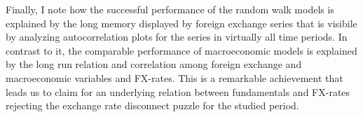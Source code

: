 Finally, I note how the successful performance of the random walk
models is explained by the long memory displayed by foreign exchange
series that is visibile by analyzing autocorrelation plots for the
series in virtually all time periods.  In contrast to it, the
comparable performance of macroeconomic models is explained by the
long run relation and correlation among foreign exchange and
macroeconomic variables and FX-rates. This is a remarkable achievement
that leads us to claim for an underlying relation between fundamentals
and FX-rates rejecting the exchange rate disconnect puzzle for the
studied period.
